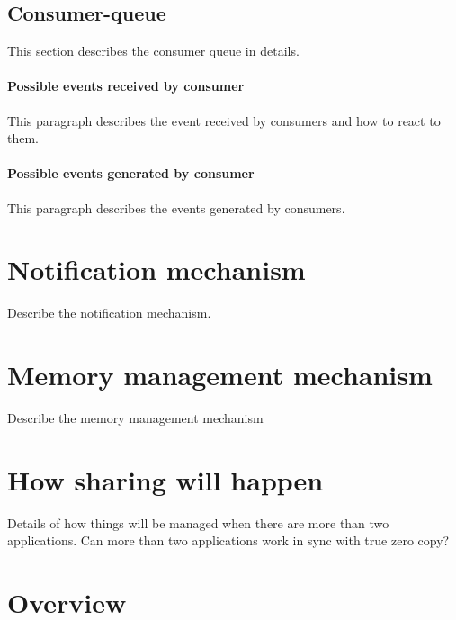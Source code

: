 \documentclass[a4paper,twoside]{report} %
\begin{document}
\subsection{Consumer-queue}
This section describes the consumer queue in details.

\paragraph{Possible events received by consumer}
This paragraph describes the event received by consumers and how
to react to them.

\paragraph{Possible events generated by consumer}
This paragraph describes the events generated by consumers.

\section{Notification mechanism}
Describe the notification mechanism.

\section{Memory management mechanism}
Describe the memory management mechanism

\section{How sharing will happen}
Details of how things will be managed when there are more than two
applications. Can more than two applications work in sync with true 
zero copy?

\section{Overview}
\end{document}
